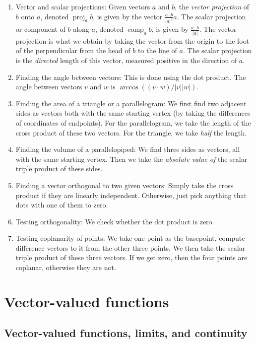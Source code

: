 \documentclass[10pt]{amsart}
\begin{document}
\begin{enumerate}
\item Vector and scalar projections: Given vectors $a$ and $b$, the
  {\em vector projection} of $b$ onto $a$, denoted
  $\operatorname{proj}_ab$, is given by the vector $\frac{a \cdot
    b}{|a|^2} a$. The scalar projection or component of
  $b$ along $a$, denoted $\operatorname{comp}_ab$, is given by
  $\frac{a \cdot b}{|a|}$. The vector projection is what we obtain by
  taking the vector from the origin to the foot of the perpendicular
  from the head of $b$ to the line of $a$. The scalar projection is
  the {\em directed} length of this vector, measured positive in the
  direction of $a$.
\item Finding the angle between vectors: This is done using the dot
  product. The angle between vectors $v$ and $w$ is $\arccos((v \cdot
  w)/|v||w|)$.
\item Finding the area of a triangle or a parallelogram: We first find
  two adjacent sides as vectors both with the same starting vertex (by
  taking the differences of coordinates of endpoints). For the
  parallelogram, we take the length of the cross product of these two
  vectors. For the triangle, we take {\em half} the length.
\item Finding the volume of a parallelopiped: We find three sides as
  vectors, all with the same starting vertex. Then we take the {\em
  absolute value of} the scalar triple product of these sides.
\item Finding a vector orthogonal to two given vectors: Simply take
  the cross product if they are linearly independent. Otherwise, just
  pick anything that dots with one of them to zero.
\item Testing orthogonality: We check whether the dot product is zero.
\item Testing coplanarity of points: We take one point as the
  basepoint, compute difference vectors to it from the other three
  points. We then take the scalar triple product of these three
  vectors. If we get zero, then the four points are coplanar,
  otherwise they are not.
\end{enumerate}

\section{Vector-valued functions}

\subsection{Vector-valued functions, limits, and continuity}
\end{document}
